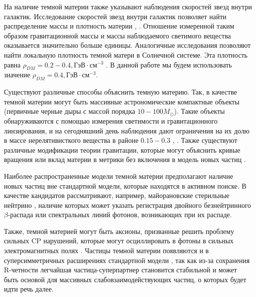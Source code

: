 На наличие темной материи также указывают наблюдения скоростей звезд внутри галактик. Исследование скоростей звезд внутри галактик позволяет найти распределение массы и плотность материи \cite{Radial_velocity_measurements}, \cite{Angular_Velocity}. Отношение измеренной таким образом гравитационной массы и массы наблюдаемого светимого вещества оказывается значительно больше единицы. Аналогичные исследования позволяют найти локальную плотность темной матери в Солнечной системе. Эта плотность равна $\rho_{DM} = 0.2 - 0.4, \text{ГэВ} \cdot \text{см}^{-3}$ \cite{palau2022oblateness}. В данной работе мы будем использовать значение  $\rho_{DM} = 0.4, \text{ГэВ} \cdot  \text{см}^{-3}$.


Существуют различные способы объяснить темную материю. Так, в качестве темной материи могут быть массивные астрономические компактные объекты (первичные черные дыры с массой порядка $10-100M_{\odot}$). Такие объекты обнаруживаются с помощью измерения светимости и гравитационного линзирования, и на сегодняшний день наблюдения дают ограничения на их долю в массе нерелятивисткого вещества в районе $0.15-0.3$ \cite{Zumalac_rregui_2018}, \cite{Blaineau_2022}.
Также существуют различные модификации теории гравитации, которые могут объяснить кривые вращения или вклад материи в метрики без включения в модель новых частиц \cite{1984ApJ...286....7B}.


Наиболее распространенные модели темной материи предполагают наличие новых частиц вне стандартной модели, которые находятся в активном поиске. В качестве кандидатов рассматривают, например, майорановские стерильные нейтрино \cite{Boyarsky_2019}, наличие которых может указать регистрация двойного безнейтринного $\beta$-распада или спектральных линий фотонов, возникающих при их распаде. 

Также, темной материей могут быть аксионы, призванные решить проблему сильных CP нарушений, которые могут осциллировать в фотоны в сильных электромагнитных полях \cite{adams2023axion}. Частицы темной материи появляются и в суперсимметричных расширениях стандартной	 модели \cite{berezinsky1996dark}, так как из-за сохранения R-четности легчайшая частица-суперпартнер становится стабильной и может быть основой для массивных слабовзаимодействующих частиц, о которых будет идти речь далее.

